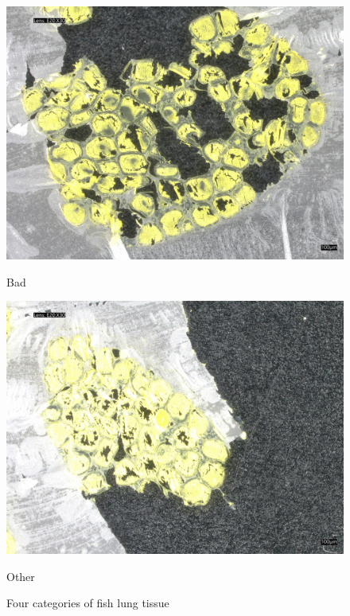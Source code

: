 \begin{figure}[H]
\begin{minipage}{0.24\textwidth}
        \centering
        \includegraphics[width=\textwidth]{./fig/fish_lung/bad20240313_140952.jpg}
        \caption*{Bad}
    \end{minipage}
    \begin{minipage}{0.24\textwidth}
        \centering
        \includegraphics[width=\textwidth]{./fig/fish_lung/other20240313_141858.jpg}
        \caption*{Other}
    \end{minipage}
    \caption{Four categories of fish lung tissue}
    \label{fig:fish_lung}
\end{figure}

